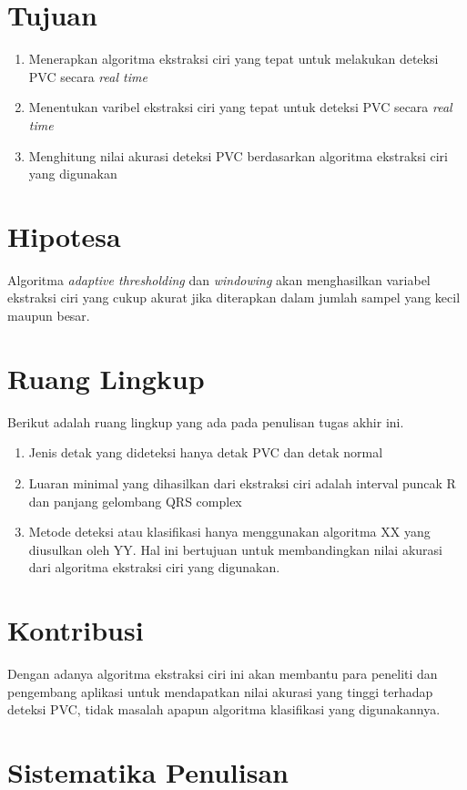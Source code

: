 \section{Tujuan}
\begin{enumerate}
    \item Menerapkan algoritma ekstraksi ciri yang tepat untuk melakukan deteksi PVC secara \textit{real time}
    \item Menentukan varibel ekstraksi ciri yang tepat untuk deteksi PVC secara \textit{real time}
    \item Menghitung nilai akurasi deteksi PVC berdasarkan algoritma ekstraksi ciri yang digunakan
\end{enumerate}

\section{Hipotesa}
	Algoritma \textit{adaptive thresholding} dan \textit{windowing} akan menghasilkan variabel ekstraksi ciri yang cukup akurat jika diterapkan dalam jumlah sampel yang kecil maupun besar.

\section{Ruang Lingkup}
Berikut adalah ruang lingkup yang ada pada penulisan tugas akhir ini.
\begin{enumerate}
	\item Jenis detak yang dideteksi hanya detak PVC dan detak normal
	\item Luaran minimal yang dihasilkan dari ekstraksi ciri adalah interval puncak R dan panjang gelombang QRS complex
	\item Metode deteksi atau klasifikasi hanya menggunakan algoritma XX yang diusulkan oleh YY. Hal ini bertujuan untuk membandingkan nilai akurasi dari algoritma ekstraksi ciri yang digunakan.
	
\end{enumerate}

\section{Kontribusi}
Dengan adanya algoritma ekstraksi ciri ini akan membantu para peneliti dan pengembang aplikasi untuk mendapatkan nilai akurasi yang tinggi terhadap deteksi PVC, tidak masalah apapun algoritma klasifikasi yang digunakannya.

\section{Sistematika Penulisan}

